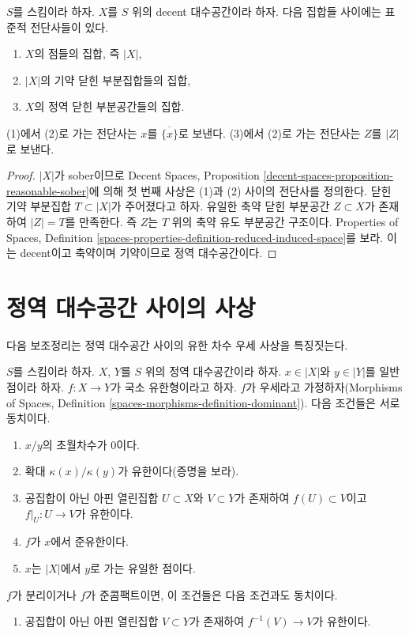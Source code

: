 \begin{lemma}
\label{lemma-decent-irreducible-closed}
$S$를 스킴이라 하자. $X$를 $S$ 위의 decent 대수공간이라 하자. 다음
집합들 사이에는 표준적 전단사들이 있다.
\begin{enumerate}
\item $X$의 점들의 집합, 즉 $|X|$,
\item $|X|$의 기약 닫힌 부분집합들의 집합,
\item $X$의 정역 닫힌 부분공간들의 집합.
\end{enumerate}
(1)에서 (2)로 가는 전단사는 $x$를 $\overline{\{x\}}$로 보낸다.
(3)에서 (2)로 가는 전단사는 $Z$를 $|Z|$로 보낸다.
\end{lemma}

\begin{proof}
$|X|$가 sober이므로 Decent Spaces, Proposition
\ref{decent-spaces-proposition-reasonable-sober}에 의해 첫 번째 사상은
(1)과 (2) 사이의 전단사를 정의한다. 닫힌 기약 부분집합
$T \subset |X|$가 주어졌다고 하자. 유일한 축약 닫힌 부분공간
$Z \subset X$가 존재하여 $|Z| = T$를 만족한다. 즉 $Z$는 $T$ 위의 축약 유도
부분공간 구조이다. Properties of Spaces, Definition
\ref{spaces-properties-definition-reduced-induced-space}를 보라. 이는 decent이고
축약이며 기약이므로 정역 대수공간이다.
\end{proof}






\section{정역 대수공간 사이의 사상}
\label{section-morphisms-between-integral-spaces}

\noindent
다음 보조정리는 정역 대수공간 사이의 유한 차수 우세 사상을
특징짓는다.

\begin{lemma}
\label{lemma-finite-degree}
$S$를 스킴이라 하자.
$X$, $Y$를 $S$ 위의 정역 대수공간이라 하자. $x \in |X|$와
$y \in |Y|$를 일반점이라 하자. $f : X \to Y$가 국소 유한형이라고
하자. $f$가 우세라고 가정하자(Morphisms of Spaces, Definition
\ref{spaces-morphisms-definition-dominant}). 다음 조건들은 서로 동치이다.
\begin{enumerate}
\item $x/y$의 초월차수가 $0$이다.
\item 확대 $\kappa(x)/\kappa(y)$가 유한이다(증명을 보라).
\item 공집합이 아닌 아핀 열린집합 $U \subset X$와 $V \subset Y$가
존재하여 $f(U) \subset V$이고 $f|_U : U \to V$가 유한이다.
\item $f$가 $x$에서 준유한이다.
\item $x$는 $|X|$에서 $y$로 가는 유일한 점이다.
\end{enumerate}
$f$가 분리이거나 $f$가 준콤팩트이면, 이 조건들은 다음 조건과도
동치이다.
\begin{enumerate}
\item[(6)] 공집합이 아닌 아핀 열린집합 $V \subset Y$가 존재하여
$f^{-1}(V) \to V$가 유한이다.
\end{enumerate}
\end{lemma}

